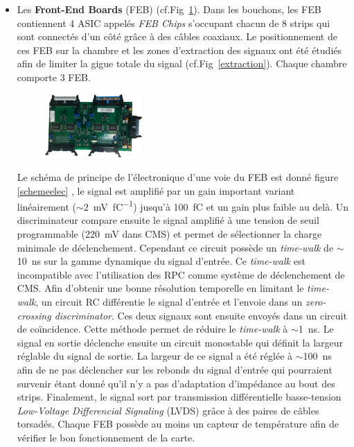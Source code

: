\begin{itemize}[label=$\bullet$]
	\item Les \textbf{Front-End Boards} (FEB) (cf.Fig~\ref{Feb}). Dans les bouchons, les FEB contiennent \num{4} ASIC appelés \textit{FEB Chips} s'occupant chacun de \num{8} strips qui sont connectés d'un côté grâce à des câbles coaxiaux. Le positionnement de ces FEB sur la chambre et les zones d'extraction des signaux ont été étudiés afin de limiter la gigue totale du signal (cf.Fig~\ref{extraction}). Chaque chambre comporte \num{3} FEB.
	
	\begin{figure}[ht!]
		\centering
		\includegraphics[width=0.35\textwidth]{RPC/Feb.png}
		\label{Feb}
	\end{figure}

	Le schéma de principe de l'électronique d'une voie du FEB est donné figure \ref{schemeelec} \cite{electro}, le signal est amplifié par un gain important variant linéairement ($\sim$\SI{2}{\milli\volt\per\femto\coulomb}) jusqu'à \SI{100}{\femto\coulomb} et un gain plus faible au delà. Un discriminateur compare ensuite le signal amplifié à une tension de seuil programmable (\SI{220}{\milli\volt} dans CMS) et permet de sélectionner la charge minimale de déclenchement. Cependant ce circuit possède un \textit{time-walk} de $\sim$\SI{10}{\nano\second} sur la gamme dynamique du signal d'entrée. Ce \textit{time-walk} est incompatible avec l'utilisation des RPC comme système de déclenchement de CMS. Afin d'obtenir une bonne résolution temporelle en limitant le \textit{time-walk}, un circuit RC différentie le signal d'entrée et l'envoie dans un \textit{zero-crossing discriminator}. Ces deux signaux sont ensuite envoyés dans un circuit de coïncidence. Cette méthode permet de réduire le \textit{time-walk} à $\sim$\SI{1}{\nano\second}. Le signal en sortie déclenche ensuite un circuit monostable qui définit la largeur réglable du signal de sortie. La largeur de ce signal a été réglée à $\sim$\SI{100}{\nano\second} afin de ne pas déclencher sur les rebonds du signal d'entrée qui pourraient survenir étant donné qu'il n'y a pas d'adaptation d'impédance au bout des strips. Finalement, le signal sort par transmission différentielle basse-tension \textit{Low-Voltage Differencial Signaling} (LVDS) grâce à des paires de câbles torsadés. Chaque FEB possède au moins un capteur de température afin de vérifier le bon fonctionnement de la carte.
	

\end{itemize}
